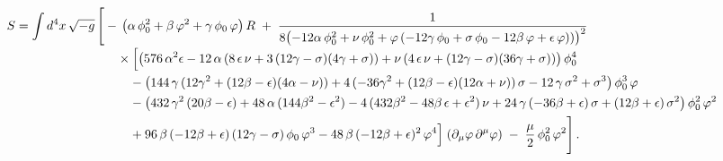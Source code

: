 \documentclass[aps,prd,reprint,preprintnumbers,showpacs,floatfix,nofootinbib,superscript address]{revtex4-2}
\begin{document}
\begin{widetext}
\begin{subequations}
\begin{align}  \label{42a}
S = \int d^4x\,\sqrt{-g}\,\Biggl[ 
  &-\,\bigl(\alpha\,\phi_0^2 + \beta\,\varphi^2 + \gamma\,\phi_0\,\varphi\bigr)\,R
  \;+\;
    \frac{1}{8\bigl(-12\alpha\,\phi_0^2 + \nu\,\phi_0^2 
      + \varphi\,(-12\gamma\,\phi_0 + \sigma\,\phi_0 - 12\beta\,\varphi + \epsilon\,\varphi))\bigr)^2}
    \nonumber\\[-0.5ex]
  &\quad\times
    \Bigl[
      \bigl(576\,\alpha^2\epsilon 
        -12\,\alpha\,(8\,\epsilon\,\nu + 3\,(12\gamma - \sigma)(4\gamma + \sigma))
        + \nu\,(4\,\epsilon\,\nu + (12\gamma - \sigma)(36\gamma + \sigma))
      \bigr)\,\phi_0^4 
    \nonumber\\
  &\quad\quad
    -\bigl(
      144\,\gamma\,(12\gamma^2 + (12\beta - \epsilon)(4\alpha - \nu))
      +4\,(-36\gamma^2 + (12\beta - \epsilon)(12\alpha + \nu))\,\sigma
      -12\,\gamma\,\sigma^2
      +\sigma^3
    \bigr)\,\phi_0^3\,\varphi
    \nonumber\\
  &\quad\quad
    -\bigl(
      432\,\gamma^2\,(20\beta - \epsilon)
      +48\,\alpha\,(144\beta^2 - \epsilon^2)
      -4\,(432\beta^2 - 48\beta\,\epsilon + \epsilon^2)\,\nu
      +24\,\gamma\,(-36\beta + \epsilon)\,\sigma
      +(12\beta + \epsilon)\,\sigma^2
    \bigr)\,\phi_0^2\,\varphi^2
    \nonumber\\
  &\quad\quad
    +96\,\beta\,(-12\beta + \epsilon)\,(12\gamma - \sigma)\,\phi_0\,\varphi^3
    -48\,\beta\,(-12\beta + \epsilon)^2\,\varphi^4
    \Bigr]
    \;(\partial_{\mu}\varphi\,\partial^{\mu}\varphi)
  \;-\;\frac{\mu}{2}\,\phi_0^2\,\varphi^2
\Biggr]\,.
\end{align}
\end{subequations}
\end{widetext}
\end{document}
